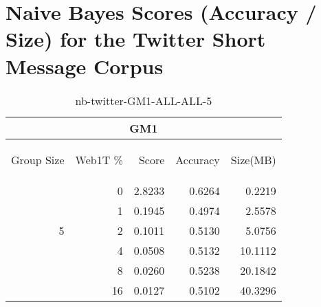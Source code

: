 \chapter{Naive Bayes Scores (Accuracy / Size) for the Twitter Short Message Corpus}

\begin{center}
\begin{table}[htbp]
\begin{tabular}{ | r | r | r | r | r |}
\hline
\multicolumn{5}{|c|}{GM1}\\
\hline
\begin{sideways}Group Size\end{sideways} & \begin{sideways}Web1T \%\end{sideways} & \begin{sideways}Score\end{sideways} & \begin{sideways}Accuracy\end{sideways} & \begin{sideways}Size(MB)\end{sideways}\\
\hline
\multirow{5}{*}{5}
 & 0 & 2.8233 & 0.6264 & 0.2219\\ \cline{2-5}
 & 1 & 0.1945 & 0.4974 & 2.5578\\ \cline{2-5}
 & 2 & 0.1011 & 0.5130 & 5.0756\\ \cline{2-5}
 & 4 & 0.0508 & 0.5132 & 10.1112\\ \cline{2-5}
 & 8 & 0.0260 & 0.5238 & 20.1842\\ \cline{2-5}
 & 16 & 0.0127 & 0.5102 & 40.3296\\ \cline{2-5}
\hline
\end{tabular}
\caption{nb-twitter-GM1-ALL-ALL-5}
\label{table:nb-twitter-GM1-ALL-ALL-5}
\end{table}
\end{center}

